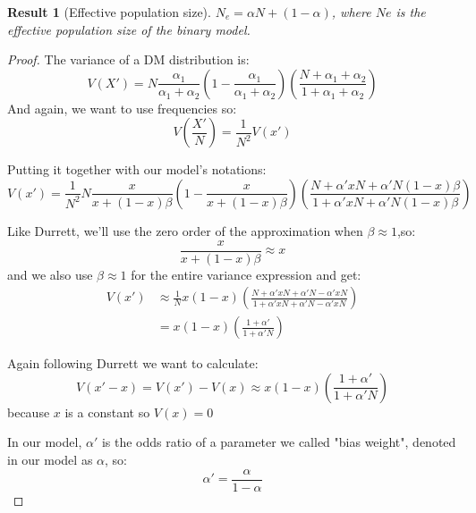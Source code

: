 \documentclass[12pt]{extarticle}
\newtheorem{result}{Result}
\begin{document}
\begin{result}[Effective population size]\label{res:effective_population}
$N_e=\alpha N + (1-\alpha)$, where $Ne$ is the effective population size of the binary model.
\end{result}

\begin{proof}
The variance of a DM distribution is:
\begin{equation}
V(X') = N\frac{\alpha_1}{\alpha_1+\alpha_2}(1-\frac{\alpha_1}{\alpha_1+\alpha_2})
(\frac{N + \alpha_1+\alpha_2}{1+\alpha_1+\alpha_2})
\end{equation}
And again, we want to use frequencies so:
\begin{equation}
V(\frac{X'}{N}) = \frac{1}{N^2}V(x')
\end{equation}

Putting it together with our model's notations:
\begin{equation}
V(x') = \frac{1}{N^2}N\frac{x}{x+(1-x)\beta}(1-\frac{x}{x+(1-x)\beta})
(\frac{N + \alpha' xN + \alpha' N(1-x)\beta}{1 + \alpha' xN + \alpha' N(1-x)\beta}) 
\end{equation}

Like Durrett, we'll use the zero order of the approximation when $\beta\approx1$,so:
\begin{equation}
\frac{x}{x + (1-x)\beta} \approx x
\end{equation}
and we also use $\beta\approx1$ for the entire variance expression and get:
\begin{equation}
\begin{split}
V(x') & \approx  \frac{1}{N} x(1-x)
(\frac{N + \alpha' xN + \alpha' N - \alpha' xN}{1 + \alpha' xN + \alpha' N - \alpha' xN})\\
&=  x(1-x)(\frac{1 + \alpha'}{1 + \alpha' N}) 
\end{split}
\end{equation}

Again following Durrett we want to calculate:
\begin{equation}\label{eq:var_diff_durret}
V(x'-x) = V(x') - V(x) \approx  x(1-x)(\frac{1 + \alpha'}{1 + \alpha' N})
\end{equation}
because $x$ is a constant so $V(x) = 0$

In our model, $\alpha'$ is the odds ratio of a parameter we called "bias weight", denoted in our model as $\alpha$, so:
\begin{equation}\label{eq:success_ratio}
\alpha' = \frac{\alpha}{1-\alpha}
\end{equation}


\end{proof}
\end{document}
